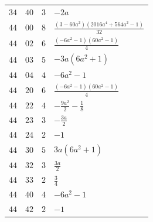 \begin{longtable}{@{}ccc>{\raggedright\arraybackslash}p{}@{}}
$34$ & $40$ & $3$ & $- 2 a$ \\
$44$ & $00$ & $8$ & $\frac{\left(3 - 60 a^{2}\right) \left(2016 a^{4} + 564 a^{2} - 1\right)}{32}$ \\
$44$ & $02$ & $6$ & $\frac{\left(- 6 a^{2} - 1\right) \left(60 a^{2} - 1\right)}{4}$ \\
$44$ & $03$ & $5$ & $- 3 a \left(6 a^{2} + 1\right)$ \\
$44$ & $04$ & $4$ & $- 6 a^{2} - 1$ \\
$44$ & $20$ & $6$ & $\frac{\left(- 6 a^{2} - 1\right) \left(60 a^{2} - 1\right)}{4}$ \\
$44$ & $22$ & $4$ & $- \frac{9 a^{2}}{2} - \frac{1}{8}$ \\
$44$ & $23$ & $3$ & $- \frac{3 a}{2}$ \\
$44$ & $24$ & $2$ & $-1$ \\
$44$ & $30$ & $5$ & $3 a \left(6 a^{2} + 1\right)$ \\
$44$ & $32$ & $3$ & $\frac{3 a}{2}$ \\
$44$ & $33$ & $2$ & $\frac{3}{4}$ \\
$44$ & $40$ & $4$ & $- 6 a^{2} - 1$ \\
$44$ & $42$ & $2$ & $-1$ \\
\end{longtable}\endgroup


